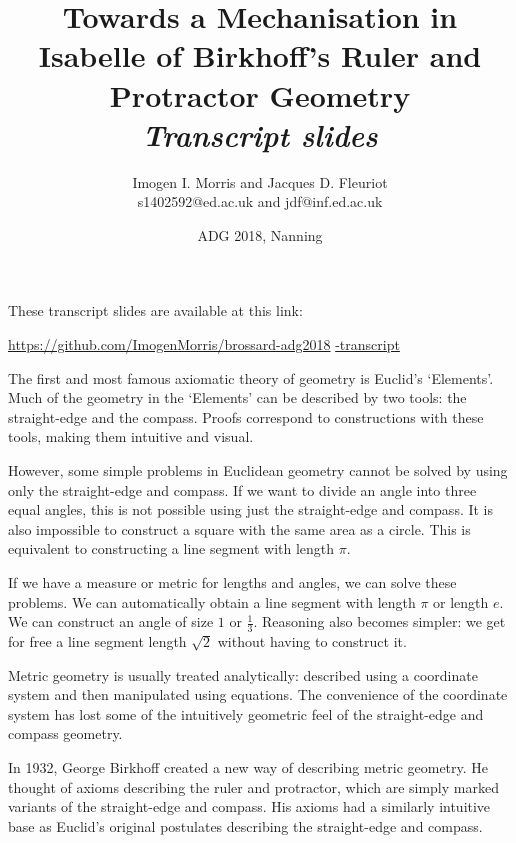 \documentclass{beamer}
\title{Towards a Mechanisation in Isabelle of Birkhoff's Ruler and Protractor Geometry \\ \textit{Transcript slides}}
\author{Imogen I. Morris and Jacques D. Fleuriot \\
s1402592@ed.ac.uk and jdf@inf.ed.ac.uk}
\institute{The University of Edinburgh}
\date{ADG 2018, Nanning}
\begin{document}
\begin{frame}
These transcript slides are available at this link:

\url{https://github.com/ImogenMorris/brossard-adg2018}
\url{-transcript}
\end{frame}

\begin{frame}[plain]
\graphicspath{{/Users/Imogen/Desktop/Birkhoff_Presentation/}}
\end{frame}

\begin{frame}[plain]
 The first and most famous axiomatic theory of geometry is Euclid's `Elements'. Much of the geometry in the `Elements' can be described by two tools: the straight-edge and the compass. Proofs correspond to constructions with these tools, making them intuitive and visual. 
 
 However, some simple problems in Euclidean geometry cannot be solved by using only the straight-edge and compass. If we want to divide an angle into three equal angles, this is not possible using just the straight-edge and compass. It is also impossible to construct a square with the same area as a circle. This is equivalent to constructing a line segment with length $\pi$.
 
 If we have a measure or metric for lengths and angles, we can solve these problems. We can automatically obtain a line segment with length $\pi$ or length $e$. We can construct an angle of size $1$ or $\frac{1}{3}$. Reasoning also becomes simpler: we get for free a line segment length $\sqrt 2$ without having to construct it.
\end{frame}

\begin{frame}[plain]
 Metric geometry is usually treated analytically: described using a coordinate system and then manipulated using equations. The convenience of the coordinate system has lost some of the intuitively geometric feel of the straight-edge and compass geometry. 
 
 In 1932, George Birkhoff created a new way of describing metric geometry. He thought of axioms describing the ruler and protractor, which are simply marked variants of the straight-edge and compass. His axioms had a similarly intuitive base as Euclid's original postulates describing the straight-edge and compass.
 
 \end{frame}
\end{document}
